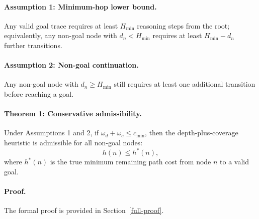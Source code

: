 \documentclass[10pt]{article}
\begin{document}
\paragraph{Assumption 1: Minimum-hop lower bound.}
Any valid goal trace requires at least \(H_{\min}\) reasoning steps from the root; equivalently, any non-goal node with \(d_n < H_{\min}\) requires at least \(H_{\min}-d_n\) further transitions.

\paragraph{Assumption 2: Non-goal continuation.}
Any non-goal node with \(d_n\geq H_{\min}\) still requires at least one additional transition before reaching a goal.

\paragraph{Theorem 1: Conservative admissibility.}
Under Assumptions 1 and 2, if \(\omega_d+\omega_c\leq c_{\min}\), then the depth-plus-coverage heuristic is admissible for all non-goal nodes:
\[
h(n)\leq h^*(n),
\]
where \(h^*(n)\) is the true minimum remaining path cost from node \(n\) to a valid goal.

\paragraph{Proof.}
The formal proof is provided in Section~\ref{full-proof}.
\end{document}
